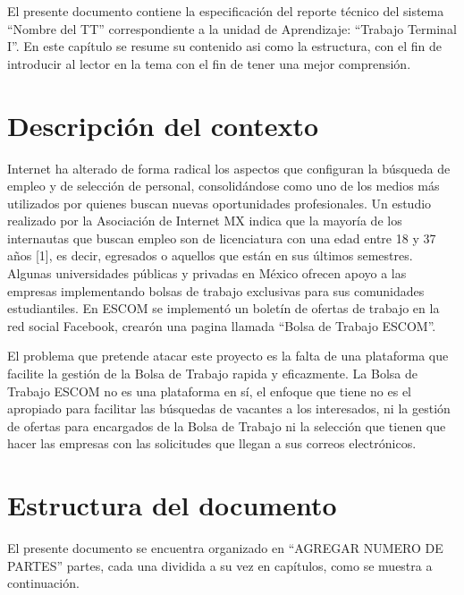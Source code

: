 \selectfont
	El presente documento contiene la especificación del reporte técnico del sistema ``Nombre del TT''
	correspondiente a la unidad de Aprendizaje: ``Trabajo Terminal I''.
	En este capítulo se resume su contenido asi como la estructura, con el fin de introducir al lector en la tema con el fin de
	tener una mejor comprensión.

	\section{Descripción del contexto}
		Internet ha alterado de forma radical los aspectos que configuran la búsqueda de empleo y de selección de personal, consolidándose 
		como uno de los medios más utilizados por quienes buscan nuevas oportunidades profesionales. Un estudio realizado por la Asociación 
		de Internet MX indica que la mayoría de los internautas que buscan empleo son de licenciatura con una edad entre 18 y 37 años [1], 
		es decir, egresados o aquellos que están en sus últimos semestres. 
		Algunas universidades públicas y privadas en México ofrecen apoyo a las empresas implementando bolsas de trabajo exclusivas para sus 
		comunidades estudiantiles. En ESCOM se implementó un boletín de ofertas de trabajo en la red social Facebook, crearón una pagina 
		llamada  ``Bolsa de Trabajo ESCOM''. 

		El problema que pretende atacar este proyecto es la falta de una plataforma que facilite la gestión de la Bolsa de Trabajo rapida
		y eficazmente. 
		La Bolsa de Trabajo ESCOM no es una plataforma en sí, el enfoque que tiene no es el apropiado para facilitar las búsquedas 
		de vacantes a los interesados, ni la gestión de ofertas para encargados de la Bolsa de Trabajo ni la selección que tienen que 
		hacer las empresas con las solicitudes que llegan a sus correos electrónicos. 



    \section{Estructura del documento}

       
	El presente documento se encuentra organizado en ``AGREGAR NUMERO DE PARTES'' partes, cada una dividida a su vez en capítulos, 
	como se muestra a continuación. \\


